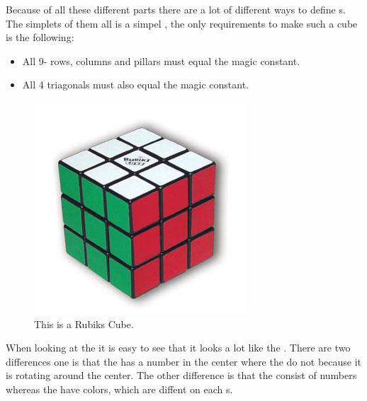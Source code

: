Because of all these different parts there are a lot of different ways to define  \mcube{}s.
The simplets of them all is a simpel  \mcube{}, the only requirements to make such a cube is the following:
\begin{itemize}
	\item All 9- rows, columns and pillars must equal the magic constant.
	\item All 4 triagonals must also equal the magic constant.
\end{itemize}

\begin{figure}[h]
	\centering
		\includegraphics[scale=0.4]{input/pics/rubiksCube}
	\caption{This is a Rubiks Cube.}
	\label{fig:rubiksCube}
\end{figure}

When looking at the \rubik{} it is easy to see that it looks a lot like the \mcube{}. There are two differences one is that the \mcube{} has a number in the center where the \rubik{} do not because it is rotating around the center. The other difference is that the \mcube{} consist of numbers whereas the \rubik{} have colors, which are diffent on each \face{}s.
